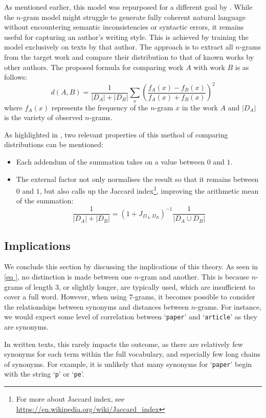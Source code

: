 \noindent As mentioned earlier, this model was repurposed for a different goal by \citet{SapAttribution}. While the $n$-gram model might struggle to generate fully coherent natural language without encountering semantic inconsistencies or syntactic errors, it remains useful for capturing an author's writing style. This is achieved by training the model exclusively on texts by that author. The approach is to extract all $n$-grams from the target work and compare their distribution to that of known works by other authors. The proposed formula for comparing work $A$ with work $B$ is as follows:
\begin{equation}
	d(A,B) = \frac{1}{|D_A|+|D_B|}\sum_x\left(\frac{f_A(x)-f_B(x)}{f_A(x)+f_B(x)}\right)^2
	\label{eq:SapAttribution_dist}
\end{equation}
where $f_A(x)$ represents the frequency of the $n$-gram $x$ in the work $A$ and $|D_A|$ is the variety of observed $n$-grams.

\noindent As highlighted in \cite{thesis}, two relevant properties of this method of comparing distributions can be mentioned:
\begin{itemize}
	\item Each addendum of the summation takes on a value between $0$ and $1$.
	\item The external factor not only normalises the result so that it remains between $0$ and $1$, but also calls up the Jaccard index\footnote{For more about Jaccard index, see \url{https://en.wikipedia.org/wiki/Jaccard_index}}, improving the arithmetic mean of the summation:
	\[
		\frac{1}{|D_A|+|D_B|} = (1+J_{D_A,D_B})^{-1}\frac{1}{|D_A\cup D_B|}
	\]
\end{itemize}

\subsection{Implications}
We conclude this section by discussing the implications of this theory. As seen in \cref{eq
}, no distinction is made between one $n$-gram and another. This is because $n$-grams of length 3, or slightly longer, are typically used, which are insufficient to cover a full word. However, when using $7$-grams, it becomes possible to consider the relationships between synonyms and distances between $n$-grams. For instance, we would expect some level of correlation between ‘\texttt{paper}’ and ‘\texttt{article}’ as they are synonyms.

\noindent In written texts, this rarely impacts the outcome, as there are relatively few synonyms for each term within the full vocabulary, and especially few long chains of synonyms. For example, it is unlikely that many synonyms for ‘\texttt{paper}’ begin with the string ‘\texttt{p}’ or ‘\texttt{pe}’.

